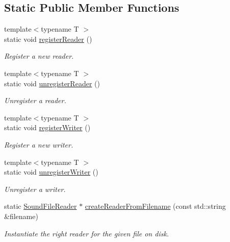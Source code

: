 \subsection*{Static Public Member Functions}
\begin{DoxyCompactItemize}
\item 
{\footnotesize template$<$typename T $>$ }\\static void \mbox{\hyperlink{classsf_1_1_sound_file_factory_acaf1f0bf1b7c7b9988ec76b33e33fe95}{register\+Reader}} ()
\begin{DoxyCompactList}\small\item\em Register a new reader. \end{DoxyCompactList}\item 
{\footnotesize template$<$typename T $>$ }\\static void \mbox{\hyperlink{classsf_1_1_sound_file_factory_a9e6765c41e2784bc755388afb4a2f432}{unregister\+Reader}} ()
\begin{DoxyCompactList}\small\item\em Unregister a reader. \end{DoxyCompactList}\item 
{\footnotesize template$<$typename T $>$ }\\static void \mbox{\hyperlink{classsf_1_1_sound_file_factory_a3a59140e6ccf1f252f721b790eddd661}{register\+Writer}} ()
\begin{DoxyCompactList}\small\item\em Register a new writer. \end{DoxyCompactList}\item 
{\footnotesize template$<$typename T $>$ }\\static void \mbox{\hyperlink{classsf_1_1_sound_file_factory_a2306f90d1f72e474732e4bcceeb34215}{unregister\+Writer}} ()
\begin{DoxyCompactList}\small\item\em Unregister a writer. \end{DoxyCompactList}\item 
static \mbox{\hyperlink{classsf_1_1_sound_file_reader}{Sound\+File\+Reader}} $\ast$ \mbox{\hyperlink{classsf_1_1_sound_file_factory_af0a87110e0b8a77aada17b22a016c066}{create\+Reader\+From\+Filename}} (const std\+::string \&filename)
\begin{DoxyCompactList}\small\item\em Instantiate the right reader for the given file on disk. \end{DoxyCompactList}\item 

\end{DoxyCompactItemize}
